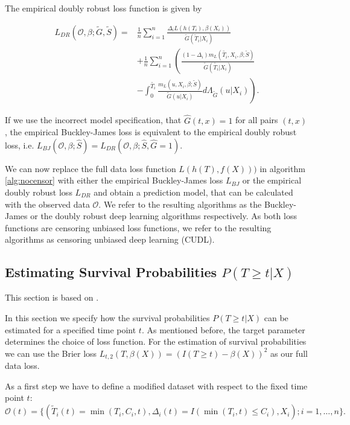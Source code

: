 \documentclass[12pt, a4paper]{scrartcl}
\theoremstyle{definition}
\theoremstyle{plain}
\numberwithin{equation}{section}
\numberwithin{figure}{section}
\numberwithin{table}{section}
\begin{document}
	The empirical doubly robust loss function is given by
	
	\begin{equation*}
	\begin{split}
	L_{DR}(\mathcal{O}, \beta; \tilde{G}, \tilde{S}) = & \frac{1}{n} \sum_{i=1}^n \frac{\Delta_i L(h(T_i),\beta(X_i))}{\tilde{G}(\tilde{T}_i\vert X_i)}\\
	~ & + \frac{1}{n} \sum_{i=1}^n \left(\frac{(1-\Delta_i)m_L(\tilde{T_i}, X_i, \beta; \tilde{S})}{\tilde{G}(\tilde{T_i}\vert X_i)} \right.\\
	& - \left. \int _0^{\tilde{T_i}} \frac{m_L(u, X_i, \beta; \tilde{S})}{\tilde{G}(u \vert X_i)} d \Lambda_{\tilde{G}}(u \vert X_i) \right).
	\end{split}
	\end{equation*}
	
	If we use the incorrect model specification, that $\hat{G}(t,x)=1$ for all pairs $(t,x)$, the empirical  Buckley-James loss is equivalent to the empirical doubly robust loss, i.e. $L_{BJ}(\mathcal{O}, \beta; \hat{S})=L_{DR}(\mathcal{O}, \beta; \hat{S}, \hat{G} = 1)$.
	
	We can now replace the full data loss function $L(h(T), f(X)))$ in algorithm \ref{alg:nocensor} with either the empirical Buckley-James loss $L_{BJ}$ or the empirical doubly robust loss $L_{DR}$ and obtain a prediction model, that can be calculated with the observed data $\mathcal{O}$.
	We refer to the resulting algorithms as the Buckley-James or the doubly robust deep learning algorithms respectively.
	As both loss functions are censoring unbiased loss functions, we refer to the resulting algorithms as censoring unbiased deep learning (CUDL). 
	
	\subsection{Estimating Survival Probabilities $P(T\geq t \vert X)$}
	
	This section is based on \citet*{basearticle}.
	
	In this section we specify how the survival probabilities $P(T\geq t \vert X)$ can be estimated for a specified time point $t$.
	As mentioned before, the target parameter determines the choice of loss function.
	For the estimation of survival probabilities we can use the Brier loss $L_{t,2}(T, \beta(X)) = (I(T \geq t) - \beta(X))^2$ as our full data loss.
	
	As a first step we have to define a modified dataset with respect to the fixed time point $t$:
	\begin{equation*}
		\mathcal{O}(t) = \{(\tilde{T}_i(t)=\min(T_i, C_i, t), \Delta_i(t) = I(\min(T_i, t) \leq C_i), X_i); i = 1,\dots,n\}.
	\end{equation*}
	
\end{document}
